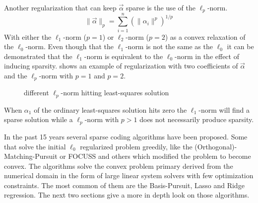 Another regularization that can keep $\vec{\alpha}$ sparse is the use of the
$\ell_p$-norm.
\begin{equation*}
\lVert \vec{\alpha}\rVert_p = \sum_{i=1}^n\left(\lVert \alpha_i
\lVert^p\right)^{1/p}
\end{equation*}
With either the $\ell_1$-norm ($p=1$) or $\ell_2$-norm ($p=2$) as a
convex relaxation of the $\ell_0$-norm. Even though that the $\ell_1$-norm is
not the same as the $\ell_0$ it can be demonstrated that the $\ell_1$-norm is
equivalent to the $\ell_0$-norm in the effect of inducing sparsity. 
 shows an example of regularization with two coefficients
of $\vec{\alpha}$ and the $\ell_p$-norm with $p=1$ and $p=2$.
\begin{figure}[h]
\centering
{}
\vspace{2mm}
\caption[$\ell_p$ regularization]{different $\ell_p$-norm hitting least-squares
solution}
\label{fig:sparse}
\end{figure}
When $\alpha_1$ of the ordinary least-squares solution hits zero the
$\ell_1$-norm will find a sparse solution while a $\ell_p$-norm with $p>1$ does
not necessarily produce sparsity.

In the past 15 years several sparse coding algorithms have been proposed. Some
that solve the initial $\ell_0$ regularized problem greedily, like
the (Orthogonal)-Matching-Pursuit or FOCUSS and others which modified the
problem to become convex. The algorithms solve the convex problem primary
derived from the numerical domain in the form of large linear system solvers
with few optimization constraints. The most common of them are the
Basis-Pursuit, Lasso and Ridge regression. The next two sections give a
more in depth look on those algorithms. 


